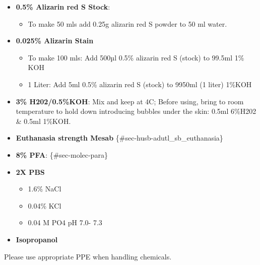 \documentclass[
  letterpaper,
  DIV=11,
  numbers=noendperiod]{scrreprt}
\providecommand{\tightlist}{%
  \setlength{\itemsep}{0pt}\setlength{\parskip}{0pt}}\usepackage{longtable,booktabs,array}
\begin{document}
\begin{itemize}
\tightlist
\item
  \textbf{0.5\% Alizarin red S Stock}:

  \begin{itemize}
  \tightlist
  \item
    To make 50 mls add 0.25g alizarin red S powder to 50 ml water.
  \end{itemize}
\item
  \textbf{0.025\% Alizarin Stain}

  \begin{itemize}
  \tightlist
  \item
    To make 100 mls: Add 500µl 0.5\% alizarin red S (stock) to 99.5ml
    1\% KOH
  \item
    1 Liter: Add 5ml 0.5\% alizarin red S (stock) to 9950ml (1 liter)
    1\%KOH
  \end{itemize}
\item
  \textbf{3\% H202/0.5\%KOH}: Mix and keep at 4C; Before using, bring to
  room temperature to hold down introducing bubbles under the skin:
  0.5ml 6\%H202 \& 0.5ml 1\%KOH.
\item
  \textbf{Euthanasia strength Mesab}
  \{\#sec-husb-adutl\_sb\_euthanasia\}
\item
  \textbf{8\% PFA}: \{\#sec-molec-para\}
\item
  \textbf{2X PBS}

  \begin{itemize}
  \tightlist
  \item
    1.6\% NaCl
  \item
    0.04\% KCl
  \item
    0.04 M PO4 pH 7.0- 7.3
  \end{itemize}
\item
  \textbf{Isopropanol}
\end{itemize}

\begin{tcolorbox}[enhanced jigsaw, rightrule=.15mm, title=\textcolor{quarto-callout-warning-color}{\faExclamationTriangle}\hspace{0.5em}{Chemical Warning}, titlerule=0mm, opacitybacktitle=0.6, toprule=.15mm, bottomrule=.15mm, opacityback=0, left=2mm, colframe=quarto-callout-warning-color-frame, breakable, coltitle=black, colback=white, colbacktitle=quarto-callout-warning-color!10!white, bottomtitle=1mm, leftrule=.75mm, toptitle=1mm, arc=.35mm]

Please use appropriate PPE when handling chemicals.

\end{tcolorbox}
\end{document}
